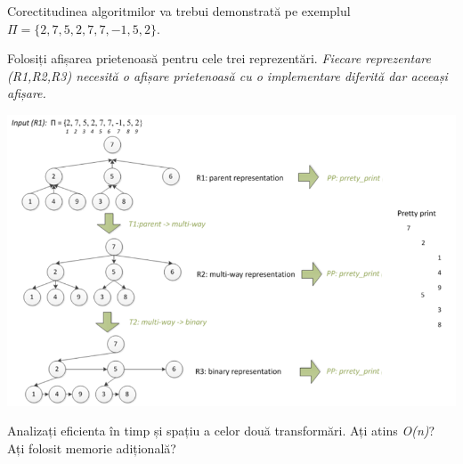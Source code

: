 \documentclass[../ro-fa-lab.tex]{subfiles}
\begin{document}
Corectitudinea algoritmilor va trebui demonstrată pe exemplul
\(\Pi = \{ 2,7,5,2,7,7, - 1,5,2\}\).

Folosiți afișarea prietenoasă pentru cele trei reprezentări.
\emph{Fiecare reprezentare (R1,R2,R3) necesită o afișare prietenoasă cu
o implementare diferită dar aceeași afișare.}

\includegraphics[width=\textwidth]{../Resources/lab6/Lab6_representations.png}

Analizați eficienta în timp și spațiu a celor două transformări. Ați
atins \emph{O(n)}? Ați folosit memorie adițională?
\end{document}
